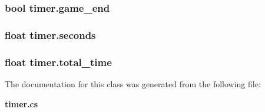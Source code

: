 \subsubsection[{game\+\_\+end}]{\setlength{\rightskip}{0pt plus 5cm}bool timer.\+game\+\_\+end\hspace{0.3cm}{\ttfamily [static]}}\label{classtimer_accefbb27aaee2e7e38836c02676ed0a6}
\subsubsection[{seconds}]{\setlength{\rightskip}{0pt plus 5cm}float timer.\+seconds}\label{classtimer_a1e354121c9d1f8118a0435ade99387b4}
\subsubsection[{total\+\_\+time}]{\setlength{\rightskip}{0pt plus 5cm}float timer.\+total\+\_\+time}\label{classtimer_a42ac0eb01548908d594fc819c3dc081b}


The documentation for this class was generated from the following file\+:\begin{DoxyCompactItemize}
\item 
{\bf timer.\+cs}\end{DoxyCompactItemize}
